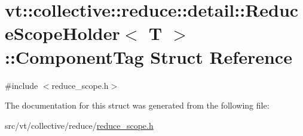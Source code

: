 \hypertarget{structvt_1_1collective_1_1reduce_1_1detail_1_1_reduce_scope_holder_1_1_component_tag}{}\section{vt\+:\+:collective\+:\+:reduce\+:\+:detail\+:\+:Reduce\+Scope\+Holder$<$ T $>$\+:\+:Component\+Tag Struct Reference}
\label{structvt_1_1collective_1_1reduce_1_1detail_1_1_reduce_scope_holder_1_1_component_tag}


{\ttfamily \#include $<$reduce\+\_\+scope.\+h$>$}



The documentation for this struct was generated from the following file\+:\begin{DoxyCompactItemize}
\item 
src/vt/collective/reduce/\hyperlink{reduce__scope_8h}{reduce\+\_\+scope.\+h}\end{DoxyCompactItemize}
